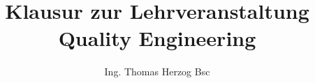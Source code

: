 \documentclass[german]{report}
\title{Klausur zur Lehrveranstaltung Quality Engineering}
\author{Ing. Thomas Herzog Bsc}
\begin{document}
\maketitle

\begin{abstract}
\end{abstract}



\end{document}
